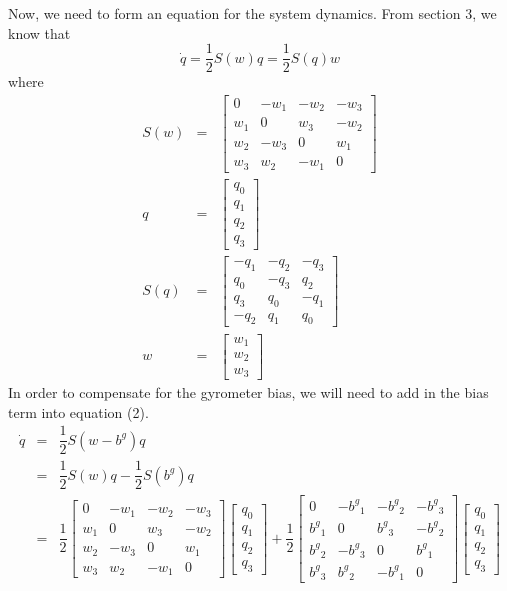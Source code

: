 \documentclass[a4paper,12pt]{book}
\begin{document}
Now, we need to form an equation for the system dynamics. From section 3, we know that
\begin{equation}
    \dot{q}=\dfrac{1}{2}S(w)q=\dfrac{1}{2}S(q)w
\end{equation}
where
\begin{eqnarray}
    S(w) &=&\begin{bmatrix} 0 & -w_1 & -w_2 & -w_3 \\
                            w_1 &  0 & w_3&  -w_2 \\
                            w_2 & -w_3 & 0 & w_1 \\
                            w_3 & w_2 & -w_1 & 0 \end{bmatrix} \\
    q&=&\begin{bmatrix} q_0 \\ q_1 \\ q_2 \\ q_3\end{bmatrix} \\ 
    S(q)&=&\begin{bmatrix} -q_1 & -q_2 & -q_3 \\ q_0 & -q_3 & q_2 \\ q_3 & q_0 & -q_1 \\ -q_2 & q_1 & q_0 \end{bmatrix} \\
    w &=&\begin{bmatrix} w_1 \\ w_2 \\ w_3\end{bmatrix}
\end{eqnarray}
In order to compensate for the gyrometer bias, we will need to add in the bias term into equation (2).
\begin{eqnarray}
    \dot{q} &=&\dfrac{1}{2}S(w - b^g)q \\ 
    &=& \dfrac{1}{2}S(w)q - \dfrac{1}{2}S(b^g)q \\
    &=& \dfrac{1}{2}\begin{bmatrix} 0 & -w_1 & -w_2 & -w_3 \\ w_1 & 0 & w_3 & -w_2 \\ w_2 & -w_3 & 0 & w_1 \\ w_3 & w_2 & -w_1 & 0 \end{bmatrix}\begin{bmatrix} q_0 \\ q_1 \\ q_2 \\ q_3\end{bmatrix} + \dfrac{1}{2}\begin{bmatrix} 0 & -{b^g}_1 & -{b^g}_2 & -{b^g}_3 \\ {b^g}_1 & 0 & {b^g}_3 & -{b^g}_2 \\ {b^g}_2 & -{b^g}_3 & 0 & {b^g}_1 \\ {b^g}_3 & {b^g}_2 & -{b^g}_1 & 0 \end{bmatrix}\begin{bmatrix} q_0 \\ q_1 \\ q_2 \\ q_3 \end{bmatrix}
\end{eqnarray}
\end{document}
